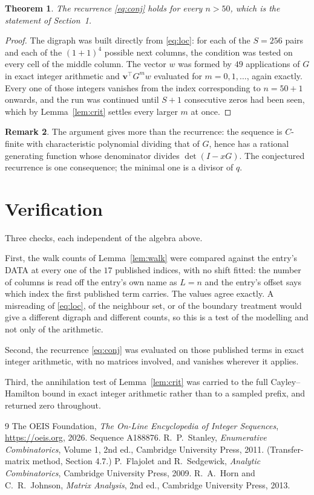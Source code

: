\documentclass[11pt,a4paper]{article}
\theoremstyle{plain}
\newtheorem{theorem}{Theorem}
\theoremstyle{definition}
\newtheorem{remark}[theorem]{Remark}
\begin{document}
\begin{theorem}
The recurrence \eqref{eq:conj} holds for every $n>50$, which is the statement of
Section~1.
\end{theorem}

\begin{proof}
The digraph was built directly from \eqref{eq:loc}: for each of the $S=256$ pairs and each
of the $(1+1)^{4}$ possible next columns, the condition was tested on every cell of
the middle column. The vector $w$ was formed by $49$ applications of $G$ in exact integer
arithmetic and $\mathbf{v}^{\!\top}G^{m}w$ evaluated for $m=0,1,\dots$, again exactly.
Every one of those integers vanishes from the index corresponding to $n=50+1$ onwards,
and the run was continued until $S+1$ consecutive zeros had been seen, which by
Lemma~\ref{lem:crit} settles every larger $m$ at once.
\end{proof}

\begin{remark}
The argument gives more than the recurrence: the sequence is $C$-finite with characteristic
polynomial dividing that of $G$, hence has a rational generating function whose denominator
divides $\det(I-xG)$. The conjectured recurrence is one consequence; the minimal one is a
divisor of $q$.
\end{remark}

\section{Verification}

Three checks, each independent of the algebra above.

First, the walk counts of Lemma~\ref{lem:walk} were compared against the entry's DATA at
every one of the $17$ published indices, with no shift fitted: the number of columns is
read off the entry's own name as $L=n$ and the entry's offset says which index the first
published term carries. The values agree exactly. A misreading of \eqref{eq:loc}, of the
neighbour set, or of the boundary treatment would give a different digraph and different
counts, so this is a test of the modelling and not only of the arithmetic.

Second, the recurrence \eqref{eq:conj} was evaluated on those published terms in exact
integer arithmetic, with no matrices involved, and vanishes wherever it applies.

Third, the annihilation test of Lemma~\ref{lem:crit} was carried to the full
Cayley--Hamilton bound in exact integer arithmetic rather than to a sampled prefix, and
returned zero throughout.

\begin{thebibliography}{9}
 The OEIS Foundation, \emph{The On-Line Encyclopedia of Integer
Sequences}, \url{https://oeis.org}, 2026. Sequence A188876.
 R.~P.~Stanley, \emph{Enumerative Combinatorics}, Volume 1, 2nd ed.,
Cambridge University Press, 2011. (Transfer-matrix method, Section 4.7.)
 P.~Flajolet and R.~Sedgewick, \emph{Analytic Combinatorics}, Cambridge
University Press, 2009.
 R.~A.~Horn and C.~R.~Johnson, \emph{Matrix Analysis}, 2nd ed., Cambridge
University Press, 2013.
\end{thebibliography}
\end{document}
